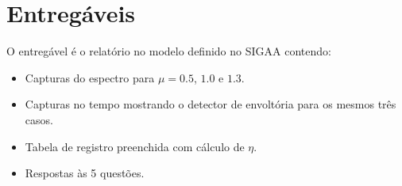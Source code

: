 \documentclass[11pt,a4paper]{article}
\begin{document}
\section{Entregáveis}

O entregável é o relatório no modelo definido no SIGAA contendo:

\begin{itemize}
  \item Capturas do espectro para $\mu = 0.5$, $1.0$ e $1.3$.
  \item Capturas no tempo mostrando o detector de envoltória para os
    mesmos três casos.
  \item Tabela de registro preenchida com cálculo de $\eta$.
  \item Respostas às 5 questões.
\end{itemize}
\end{document}

